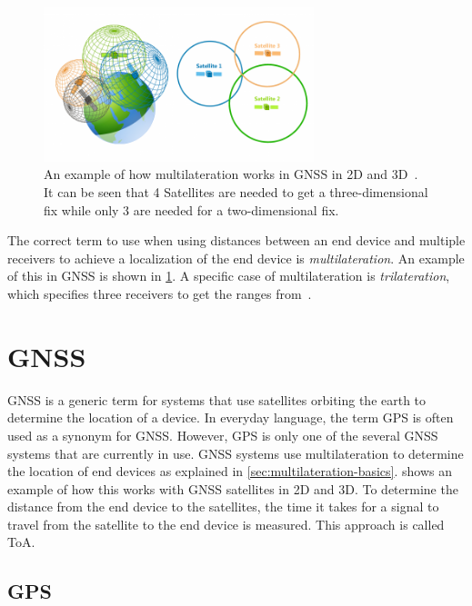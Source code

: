 \begin{figure}[htbp]
    \centering
    \includegraphics[width=0.7\textwidth]{pictures/multilateration/gps_multilateration.png}
    \caption{
        An example of how multilateration works in \ac{GNSS} in 2D and 3D~\protect\cite{gisgeography_how_2018}.
        It can be seen that 4 Satellites are needed to get a three-dimensional fix while only 3 are needed for a two-dimensional fix.
    }\label{pic:multilateration-gps-2d-3d-example}
\end{figure}

The correct term to use when using distances between an end device and multiple receivers to achieve a localization of the end device is \emph{multilateration}.
An example of this in \ac{GNSS} is shown in \cref{pic:multilateration-gps-2d-3d-example}.
A specific case of multilateration is \emph{trilateration}, which specifies three receivers to get the ranges from~\cite{ruiz_efficient_2013}.

\section{\acf{GNSS}}

\ac{GNSS} is a generic term for systems that use satellites orbiting the earth to determine the location of a device.
In everyday language, the term \ac{GPS} is often used as a synonym for \ac{GNSS}.
However, \ac{GPS} is only one of the several \ac{GNSS} systems that are currently in use.
\ac{GNSS} systems use multilateration to determine the location of end devices as explained in \cref{sec:multilateration-basics}.
 shows an example of how this works with \ac{GNSS} satellites in 2D and 3D.
To determine the distance from the end device to the satellites, the time it takes for a signal to travel from the satellite to the end device is measured.
This approach is called \acf{ToA}.

\subsection{\acf{GPS}}

